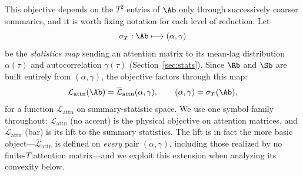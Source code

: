 \documentclass{article}
\begin{document}
This objective depends on the $T^2$ entries of $\Ab$ only through successively
coarser summaries, and it is worth fixing notation for each level of reduction.
Let
\begin{equation}
    \sigma_T : \Ab \longmapsto (\alpha,\gamma)
\end{equation}
be the \emph{statistics map} sending an attention matrix to its mean-lag
distribution $\alpha(\tau)$ and autocorrelation $\gamma(\tau)$
(Section~\ref{sec:stats}). Since $\Rb$ and $\Sb$ are built entirely from
$(\alpha,\gamma)$, the objective factors through this map:
\begin{equation}\label{lift}
    \mathcal{L}_{\text{attn}}(\Ab) = \overline{\mathcal{L}}_{\text{attn}}(\alpha,\gamma),
    \qquad (\alpha,\gamma) = \sigma_T(\Ab),
\end{equation}
for a function $\overline{\mathcal{L}}_{\text{attn}}$ on summary-statistic space.
We use one symbol family throughout: $\mathcal{L}_{\text{attn}}$ (no accent) is
the physical objective on attention matrices, and $\overline{\mathcal{L}}_{\text{attn}}$
(bar) is its lift to the summary statistics. The lift is in fact the more basic
object---$\overline{\mathcal{L}}_{\text{attn}}$ is defined on \emph{every} pair
$(\alpha,\gamma)$, including those realized by no finite-$T$ attention
matrix---and we exploit this extension when analyzing its convexity below.
\end{document}

